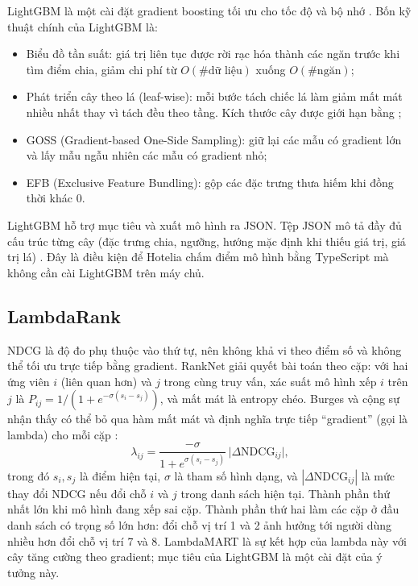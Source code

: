 LightGBM là một cài đặt gradient boosting tối ưu cho tốc độ và bộ nhớ \cite{ke2017}. Bốn kỹ thuật chính của LightGBM là:
\begin{itemize}
\item Biểu đồ tần suất: giá trị liên tục được rời rạc hóa thành các ngăn trước khi tìm điểm chia, giảm chi phí từ $O(\#\text{dữ liệu})$ xuống $O(\#\text{ngăn})$;
\item Phát triển cây theo lá (leaf-wise): mỗi bước tách chiếc lá làm giảm mất mát nhiều nhất thay vì tách đều theo tầng. Kích thước cây được giới hạn bằng ;
\item GOSS (Gradient-based One-Side Sampling): giữ lại các mẫu có gradient lớn và lấy mẫu ngẫu nhiên các mẫu có gradient nhỏ;
\item EFB (Exclusive Feature Bundling): gộp các đặc trưng thưa hiếm khi đồng thời khác 0.
\end{itemize}
LightGBM hỗ trợ mục tiêu  và xuất mô hình ra JSON. Tệp JSON mô tả đầy đủ cấu trúc từng cây (đặc trưng chia, ngưỡng, hướng mặc định khi thiếu giá trị, giá trị lá) \cite{lightgbmdocs}. Đây là điều kiện để Hotelia chấm điểm mô hình bằng TypeScript mà không cần cài LightGBM trên máy chủ.

\subsection{LambdaRank}\label{sec:lambdarank}

NDCG là độ đo phụ thuộc vào thứ tự, nên không khả vi theo điểm số và không thể tối ưu trực tiếp bằng gradient. RankNet giải quyết bài toán theo cặp: với hai ứng viên $i$ (liên quan hơn) và $j$ trong cùng truy vấn, xác suất mô hình xếp $i$ trên $j$ là $P_{ij} = 1/(1 + e^{-\sigma(s_i - s_j)})$, và mất mát là entropy chéo. Burges và cộng sự nhận thấy có thể bỏ qua hàm mất mát và định nghĩa trực tiếp ``gradient'' (gọi là lambda) cho mỗi cặp \cite{burges2006,burges2010}:
\begin{equation}
  \lambda_{ij} = \frac{-\sigma}{1 + e^{\sigma (s_i - s_j)}} \,\big|\Delta \text{NDCG}_{ij}\big|,
  \label{eq:lambda}
\end{equation}
trong đó $s_i, s_j$ là điểm hiện tại, $\sigma$ là tham số hình dạng, và $|\Delta \text{NDCG}_{ij}|$ là mức thay đổi NDCG nếu đổi chỗ $i$ và $j$ trong danh sách hiện tại. Thành phần thứ nhất lớn khi mô hình đang xếp sai cặp. Thành phần thứ hai làm các cặp ở đầu danh sách có trọng số lớn hơn: đổi chỗ vị trí 1 và 2 ảnh hưởng tới người dùng nhiều hơn đổi chỗ vị trí 7 và 8. LambdaMART là sự kết hợp của lambda này với cây tăng cường theo gradient; mục tiêu  của LightGBM là một cài đặt của ý tưởng này.

